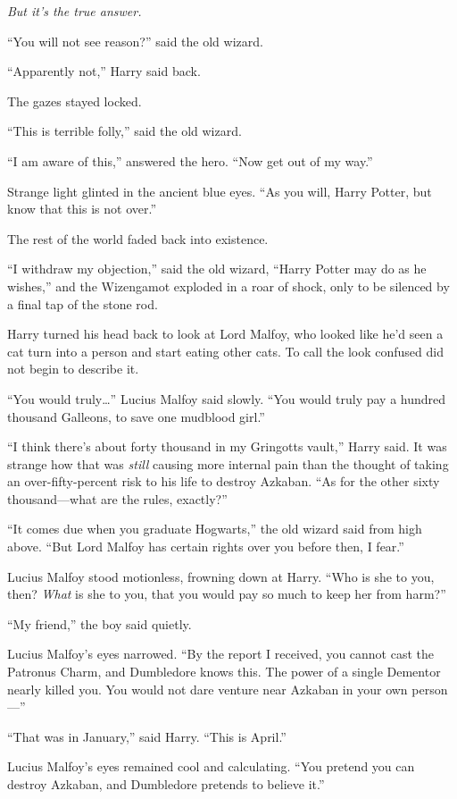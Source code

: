 \emph{But it's the true answer.}

``You will not see reason?'' said the old wizard.

``Apparently not,'' Harry said back.

The gazes stayed locked.

``This is terrible folly,'' said the old wizard.

``I am aware of this,'' answered the hero. ``Now get out of my way.''

Strange light glinted in the ancient blue eyes. ``As you will, Harry
Potter, but know that this is not over.''

The rest of the world faded back into existence.

``I withdraw my objection,'' said the old wizard, ``Harry Potter may do
as he wishes,'' and the Wizengamot exploded in a roar of shock, only to
be silenced by a final tap of the stone rod.

Harry turned his head back to look at Lord Malfoy, who looked like he'd
seen a cat turn into a person and start eating other cats. To call the
look confused did not begin to describe it.

``You would truly\ldots{}'' Lucius Malfoy said slowly. ``You would truly
pay a hundred thousand Galleons, to save one mudblood girl.''

``I think there's about forty thousand in my Gringotts vault,'' Harry
said. It was strange how that was \emph{still} causing more internal
pain than the thought of taking an over-fifty-percent risk to his life
to destroy Azkaban. ``As for the other sixty thousand---what are the
rules, exactly?''

``It comes due when you graduate Hogwarts,'' the old wizard said from
high above. ``But Lord Malfoy has certain rights over you before then, I
fear.''

Lucius Malfoy stood motionless, frowning down at Harry. ``Who is she to
you, then? \emph{What} is she to you, that you would pay so much to keep
her from harm?''

``My friend,'' the boy said quietly.

Lucius Malfoy's eyes narrowed. ``By the report I received, you cannot
cast the Patronus Charm, and Dumbledore knows this. The power of a
single Dementor nearly killed you. You would not dare venture near
Azkaban in your own person---''

``That was in January,'' said Harry. ``This is April.''

Lucius Malfoy's eyes remained cool and calculating. ``You pretend you
can destroy Azkaban, and Dumbledore pretends to believe it.''

